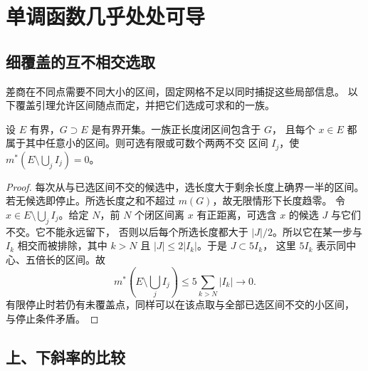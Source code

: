\section{单调函数几乎处处可导}

\subsection{细覆盖的互不相交选取}

差商在不同点需要不同大小的区间，固定网格不足以同时捕捉这些局部信息。
以下覆盖引理允许区间随点而定，并把它们选成可求和的一族。

\begin{lemma}\label{lem:vitali-fine-intervals}
设 \(E\) 有界，\(G\supset E\) 是有界开集。一族正长度闭区间包含于 \(G\)，
且每个 \(x\in E\) 都属于其中任意小的区间。则可选有限或可数个两两不交
区间 \(I_j\)，使 \(m^*(E\setminus\bigcup_j I_j)=0\)。
\end{lemma}
\begin{proof}
每次从与已选区间不交的候选中，选长度大于剩余长度上确界一半的区间。
若无候选即停止。所选长度之和不超过 \(m(G)\)，故无限情形下长度趋零。
令 \(x\in E\setminus\bigcup_jI_j\)。给定 \(N\)，前 \(N\) 个闭区间离
\(x\) 有正距离，可选含 \(x\) 的候选 \(J\) 与它们不交。它不能永远留下，
否则以后每个所选长度都大于 \(|J|/2\)。所以它在某一步与 \(I_k\)
相交而被排除，其中 \(k>N\) 且 \(|J|\le2|I_k|\)。于是 \(J\subset5I_k\)，
这里 \(5I_k\) 表示同中心、五倍长的区间。故
\[
 m^*(E\setminus\bigcup_jI_j)\le5\sum_{k>N}|I_k|\longrightarrow0.
\]
有限停止时若仍有未覆盖点，同样可以在该点取与全部已选区间不交的小区间，
与停止条件矛盾。
\end{proof}

\subsection{上、下斜率的比较}

